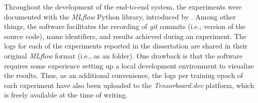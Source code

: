 
Throughout the development of the end-to-end system, the
experiments were documented with the \emph{MLflow} Python
library, introduced by \textcite{zaharia2018accelerating}.
Among other things, the software facilitates the recording
of \emph{git} commits
(i.e., version of the source code), name identifiers, and
results achieved during an experiment. The logs for each of
the experiments reported in the dissertation are shared in
their original \emph{MLflow} format (i.e., as an
 folder). One drawback is that the software
requires some experience setting up a local development
environment to visualize the results. Thus, as an additional
convenience, the logs per training epoch of each experiment
have also been uploaded to the
\emph{Tensorboard.dev}
platform, which is
freely available at the time of writing.
